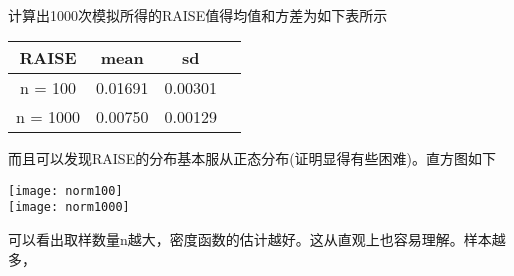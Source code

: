 \documentclass[11pt,a4paper]{ctexart}
\begin{document}
\paragraph{}
计算出1000次模拟所得的RAISE值得均值和方差为如下表所示\\
\begin{center}
	\begin{tabular}{|c|c|c|p{7cm}|}
		\hline
		RAISE & mean & sd \\ \hline
		n = 100 &  0.01691 & 0.00301 \\ \hline
		n = 1000 & 0.00750& 0.00129\\ \hline
	\end{tabular}
\end{center}
而且可以发现RAISE的分布基本服从正态分布(证明显得有些困难)。直方图如下
\begin{center}
	\texttt{[image: norm100]}\\
	\texttt{[image: norm1000]}
\end{center}
可以看出取样数量n越大，密度函数的估计越好。这从直观上也容易理解。样本越多，
\end{document}
